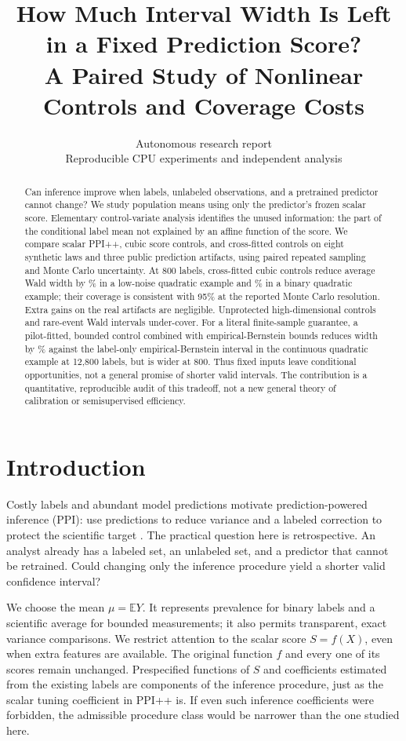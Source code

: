 \documentclass{article}
\title{How Much Interval Width Is Left in a Fixed Prediction Score?\\A Paired Study of Nonlinear Controls and Coverage Costs}
\author{Autonomous research report\\Reproducible CPU experiments and independent analysis}
\newcommand{\E}{\mathbb E}
\begin{document}
\maketitle
\begin{abstract}
Can inference improve when labels, unlabeled observations, and a pretrained predictor cannot change? We study population means using only the predictor's frozen scalar score. Elementary control-variate analysis identifies the unused information: the part of the conditional label mean not explained by an affine function of the score. We compare scalar PPI++, cubic score controls, and cross-fitted controls on eight synthetic laws and three public prediction artifacts, using paired repeated sampling and Monte Carlo uncertainty. At 800 labels, cross-fitted cubic controls reduce average Wald width by \QuadReduction\% in a low-noise quadratic example and \QuadBinaryReduction\% in a binary quadratic example; their coverage is consistent with 95\% at the reported Monte Carlo resolution. Extra gains on the real artifacts are negligible. Unprotected high-dimensional controls and rare-event Wald intervals under-cover. For a literal finite-sample guarantee, a pilot-fitted, bounded control combined with empirical-Bernstein bounds reduces width by \FiniteReduction\% against the label-only empirical-Bernstein interval in the continuous quadratic example at 12,800 labels, but is wider at 800. Thus fixed inputs leave conditional opportunities, not a general promise of shorter valid intervals. The contribution is a quantitative, reproducible audit of this tradeoff, not a new general theory of calibration or semisupervised efficiency.
\end{abstract}

\section{Introduction}
Costly labels and abundant model predictions motivate prediction-powered inference (PPI): use predictions to reduce variance and a labeled correction to protect the scientific target \citep{ppi}. The practical question here is retrospective. An analyst already has a labeled set, an unlabeled set, and a predictor that cannot be retrained. Could changing only the inference procedure yield a shorter valid confidence interval?

We choose the mean $\mu=\E Y$. It represents prevalence for binary labels and a scientific average for bounded measurements; it also permits transparent, exact variance comparisons. We restrict attention to the scalar score $S=f(X)$, even when extra features are available. The original function $f$ and every one of its scores remain unchanged. Prespecified functions of $S$ and coefficients estimated from the existing labels are components of the inference procedure, just as the scalar tuning coefficient in PPI++ is. If even such inference coefficients were forbidden, the admissible procedure class would be narrower than the one studied here.
\end{document}

